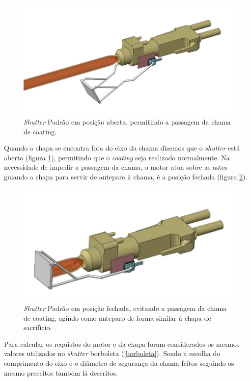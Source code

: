 \begin{figure}[h!]
\centering
	\includegraphics[width=\columnwidth]{figs/estudo/shutter/Padrao_aberto}
	\caption{\textit{Shutter} Padrão em posição aberta, permitindo a passagem da chama
	de coating.}
	\label{fig::padrao_aberto}
\end{figure}

Quando a chapa se encontra fora do eixo da chama dizemos que
o \textit{shutter} está aberto (figura \ref{fig::padrao_aberto}), permitindo que o \textit{coating}
seja realizado normalmente. Na necessidade de impedir a passagem da chama, o
motor atua sobre as astes guiando a chapa para servir de anteparo à chama, é a
posição fechada (figura \ref{fig::padrao_fechado}).

\begin{figure}[h!]
\centering
	\includegraphics[width=\columnwidth]{figs/estudo/shutter/Padrao_fechado}
	\caption{\textit{Shutter} Padrão em posição fechada, evitando a passagem da
	chama de coating, agindo como anteparo de forma similar à chapa de sacrifício.}
	\label{fig::padrao_fechado}
\end{figure}

Para calcular os requistos do motor e da chapa foram considerados os mesmos
valores utilizados no \textit{shutter} borboleta (\ref{borboleta}). Sendo a
escolha do comprimento do eixo e o diâmetro de segurança da chama feitos
seguindo os mesmo preceitos também lá descritos.

